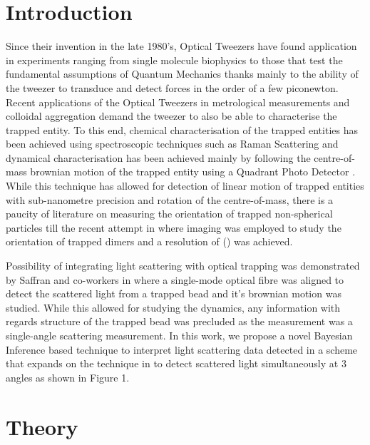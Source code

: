 \documentclass[final,3p, twocolumn]{elsarticle}
\begin{document}

\section{Introduction}
\label{1}

\indent Since their invention in the late 1980's, Optical Tweezers have found application in experiments ranging from single molecule biophysics \cite{Bustamante2021Biophysics} to those that test the fundamental assumptions of Quantum Mechanics  \cite{yin2013large} thanks mainly to the ability of the tweezer to transduce and detect forces in the order of a few piconewton. Recent applications of the Optical Tweezers in metrological measurements \cite{arita2020coherent} and colloidal aggregation \cite{burns1990optical} demand the tweezer to also be able to characterise  the trapped entity. To this end, chemical characterisation of the trapped entities has been achieved using spectroscopic techniques such as Raman Scattering \cite{gupta2014raman} and dynamical characterisation has been achieved mainly by following the centre-of-mass brownian motion of the trapped entity using a Quadrant Photo Detector \cite{friedrich2012tuning}. While this technique has allowed for detection of linear motion of trapped entities  with sub-nanometre precision \cite{friedrich2012tuning} and  rotation \cite{yifat2021facile} of the centre-of-mass, there is a paucity of literature on measuring the orientation of trapped non-spherical particles till the recent attempt in \cite{raudsepp2022estimating} where imaging was employed to study the orientation of trapped dimers and a resolution of () was achieved.   

Possibility of integrating light scattering with optical trapping was demonstrated by Saffran and 
co-workers in \cite{Bar-Ziv_1998} where a single-mode optical fibre was aligned to detect the scattered light from a trapped bead and it's brownian motion was studied. While this allowed for studying the dynamics, any information with regards structure of the trapped bead was precluded as the measurement was a single-angle scattering measurement.
In this work, we propose a novel Bayesian Inference based technique to interpret light scattering data detected in a scheme that expands on the technique in \cite{Bar-Ziv_1998} to detect scattered light simultaneously at 3 angles as shown in Figure 1.  

\section{Theory}
\label{2}
\end{document}
